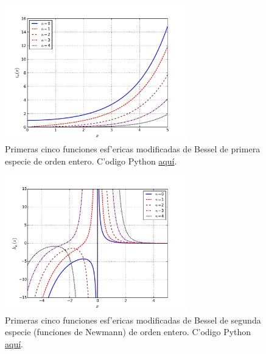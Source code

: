 \begin{figure}[H]
\centering
\includegraphics[angle=0,width=0.7\textwidth]{figs/fig-Bessel-Esferica-i.pdf}
\caption{Primeras cinco funciones esf'ericas modificadas de Bessel de primera especie de orden entero. C'odigo Python \href{https://github.com/gfrubi/FM2/blob/master/figuras-editables/fig-Bessel.py}{aqu\'i}.}
\label{fig-in}
\end{figure}
%
\begin{figure}[H]
\centering
\includegraphics[angle=0,width=0.7\textwidth]{figs/fig-Bessel-Esferica-k.pdf}
\caption{Primeras cinco funciones esf'ericas modificadas de Bessel de segunda especie (funciones de Newmann) de orden entero. C'odigo Python \href{https://github.com/gfrubi/FM2/blob/master/figuras-editables/fig-Bessel.py}{aqu\'i}.}
\label{fig-kn}
\end{figure}